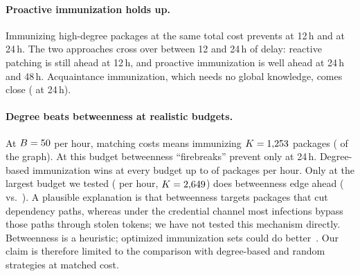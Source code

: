 \paragraph{Proactive immunization holds up.}
Immunizing high-degree packages at the same total cost prevents \RQThreeHubImmunizationTwelve{} at 12\,h
and \RQThreeHubImmunizationTwentyFour{} at 24\,h. The two approaches cross over between 12 and 24\,h of
delay: reactive patching is still ahead at 12\,h, and proactive immunization is well ahead at 24\,h and
48\,h. Acquaintance immunization, which needs no global knowledge, comes close
(\RQThreeAcquaintanceTwentyFour{} at 24\,h).

\paragraph{Degree beats betweenness at realistic budgets.}
At $B=50$ per hour, matching costs means immunizing $K=1{,}253$ packages
(\RQThreeKAtBudgetPct{} of the graph). At this budget betweenness ``firebreaks'' prevent only
\RQThreeFirebreakBetweennessTwentyFour{} at 24\,h. Degree-based immunization wins at every budget up to
\RQThreeDegreeWinsUpTo{} of packages per hour. Only at the largest budget we tested (\RQThreeMaxBudgetPct{}
per hour, $K=2{,}649$) does betweenness edge ahead (\RQThreeFirebreakMaxBudget{} vs.\
\RQThreeHubImmMaxBudget). A plausible explanation is that betweenness targets packages that cut dependency paths,
whereas under the credential channel most infections bypass those paths through stolen tokens; we have
not tested this mechanism directly. Betweenness is a heuristic; optimized immunization sets could do
better~\citep{schneider2011limited}. Our claim is therefore limited to the comparison with degree-based
and random strategies at matched cost.
